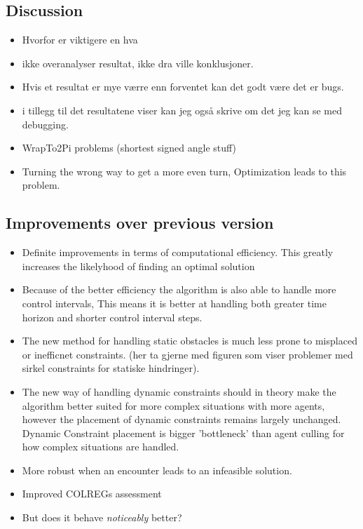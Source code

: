 \subsection{Discussion}
\begin{itemize}
    \item Hvorfor er viktigere en hva
    \item ikke overanalyser resultat, ikke dra ville konklusjoner.
    \item Hvis et resultat er mye værre enn forventet kan det godt være det er bugs.
    \item i tillegg til det resultatene viser kan jeg også skrive om det jeg kan se med debugging.
    \item WrapTo2Pi problems (shortest signed angle stuff)
    \item Turning the wrong way to get a more even turn, Optimization leads to this problem. 
\end{itemize}

\subsection{Improvements over previous version}
\begin{itemize}
    \item Definite improvements in terms of computational efficiency. This greatly increases the likelyhood of finding an optimal solution 
    \item Because of the better efficiency the algorithm is also able to handle more control intervals, This means it is better at handling both greater time horizon and shorter control interval steps.
    \item The new method for handling static obstacles is much less prone to misplaced or inefficnet constraints. (her ta gjerne med figuren som viser problemer med sirkel constraints for statiske hindringer).
    \item The new way of handling dynamic constraints should in theory make the algorithm better suited for more complex situations with more agents, however the placement of dynamic constraints remains largely unchanged.
    Dynamic Constraint placement is bigger 'bottleneck' than agent culling for how complex situations are handled. 
    \item More robust when an encounter leads to an infeasible solution.
    \item Improved COLREGs assessment
    \item But does it behave \textit{noticeably} better? 
\end{itemize}

\newpage